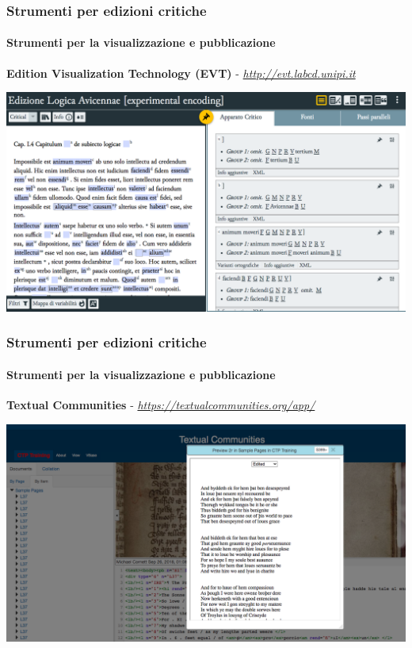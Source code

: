 \begin{frame}
    \frametitle{Strumenti per edizioni critiche}
    \framesubtitle{Strumenti per la visualizzazione e pubblicazione}
	\addtocounter{nframe}{1}
    \begin{center}
        \textbf{Edition Visualization Technology (EVT)} - \textit{\url{http://evt.labcd.unipi.it}}
    \end{center}
    \begin{center}
        \includegraphics[width=.95\textwidth]{imgs/evt.png}
	\end{center}
\end{frame}

\begin{frame}
    \frametitle{Strumenti per edizioni critiche}
    \framesubtitle{Strumenti per la visualizzazione e pubblicazione}
	\addtocounter{nframe}{1}
    \begin{center}
        \textbf{Textual Communities} - \textit{\url{https://textualcommunities.org/app/}}
    \end{center}
    \begin{center}
        \includegraphics[width=.95\textwidth]{imgs/textualcommunities.png}
	\end{center}
\end{frame}

